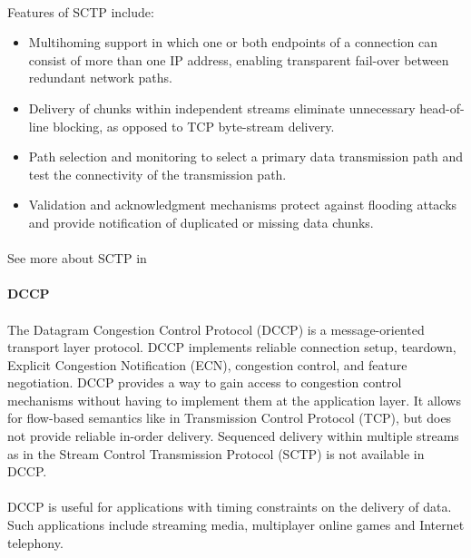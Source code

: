 \paragraph{}
Features of SCTP include:
\begin{itemize}
\item Multihoming support in which one or both endpoints of a connection can consist of more than one IP address, enabling transparent fail-over between redundant network paths.
\item Delivery of chunks within independent streams eliminate unnecessary head-of-line blocking, as opposed to TCP byte-stream delivery.
\item Path selection and monitoring to select a primary data transmission path and test the connectivity of the transmission path.
\item Validation and acknowledgment mechanisms protect against flooding attacks and provide notification of duplicated or missing data chunks.
\end{itemize}
\paragraph{}
See more about SCTP in \cite{SCTP}

\paragraph{} \textbf{DCCP}
\paragraph{}
The Datagram Congestion Control Protocol (DCCP) is a message-oriented transport layer protocol. DCCP implements reliable connection setup, teardown, Explicit Congestion Notification (ECN), congestion control, and feature negotiation. DCCP provides a way to gain access to congestion control mechanisms without having to implement them at the application layer. It allows for flow-based semantics like in Transmission Control Protocol (TCP), but does not provide reliable in-order delivery. Sequenced delivery within multiple streams as in the Stream Control Transmission Protocol (SCTP) is not available in DCCP.
\paragraph{}
DCCP is useful for applications with timing constraints on the delivery of data. Such applications include streaming media, multiplayer online games and Internet telephony.
